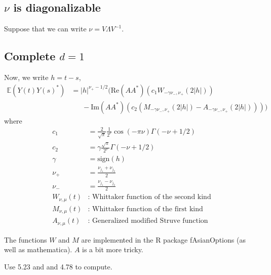 \documentclass[11pt]{article}
\begin{document}
% 



\subsection{$\nu$ is diagonalizable}


Suppose that we can write $\nu = V\Lambda V^{-1}$.



\subsection{Complete $d=1$}

Now, we write $h= t-s$, \begin{align*}
\mathbb{E}\left(Y(t) Y(s)^*\right) &= |h|^{\nu_+-  1/2}\bigg(\textrm{Re}(AA^*)\left(c_1 W_{-\gamma\nu_-, \nu_+}(2|h|)\right)\\
& \ \ \ \ \ \ \ -\textrm{Im}(AA^*)\left(c_2\left(M_{-\gamma\nu_-,\nu_+}(2|h|) - A_{-\gamma\nu_-,\nu_+ }(2|h|)\right) \right)\bigg)
\end{align*}where  \begin{align*}
c_1 &= \frac{2}{\sqrt{\pi}} \frac{1}{2^\nu}\cos(-\pi \nu) \Gamma(-\nu + 1/2)\\
c_2 &=  \gamma \frac{\sqrt{\pi}}{2^\nu}\Gamma(-\nu + 1/2)\\
\gamma &= \textrm{sign}(h) \\
\nu_+ &= \frac{\nu_{j_1} + \nu_{j_2}}{2}\\
\nu_- &= \frac{\nu_{j_1} - \nu_{j_2}}{2}\\
W_{\nu, \mu}(t) &: \textrm{ Whittaker function of the second kind}\\
M_{\nu, \mu}(t) &: \textrm{ Whittaker function of the first kind}\\ 
A_{\nu, \mu}(t) &: \textrm{ Generalized modified Struve function}
\end{align*}

The functions $W$ and $M$ are implemented in the R package fAsianOptions (as well as mathematica). $A$ is a bit more tricky.


Use 5.23 and and 4.78 to compute.
\end{document}
